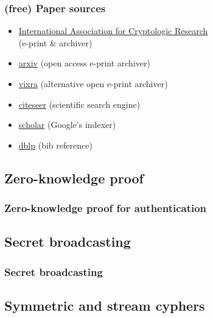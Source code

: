 \documentclass{beamer}
\begin{document}
\begin{frame}
\frametitle{(free) Paper sources}
\begin{itemize}
 \item \href{http://www.iacr.org/}{International Association for Cryptologic Research}\\(e-print \& archiver)
 \item \href{http://arxiv.org(}{arxiv} (open access e-print archiver)
 \item \href{http://vixra.org/}{vixra} (alternative open e-print archiver)
 \item \href{http://citeseerx.ist.psu.edu/}{citeseer} (scientific search engine)
 \item \href{http://scholar.google.com/}{scholar} (Google's indexer)
 \item \href{http://www.informatik.uni-trier.de/~ley/db/}{dblp} (bib reference)
\end{itemize} 
\end{frame}

\subsection{Zero-knowledge proof}

\begin{frame}
\frametitle{Zero-knowledge proof for authentication}
\end{frame}

\subsection{Secret broadcasting}

\begin{frame}
\frametitle{Secret broadcasting}
\end{frame}

\subsection{Symmetric and stream cyphers}
\end{document}
